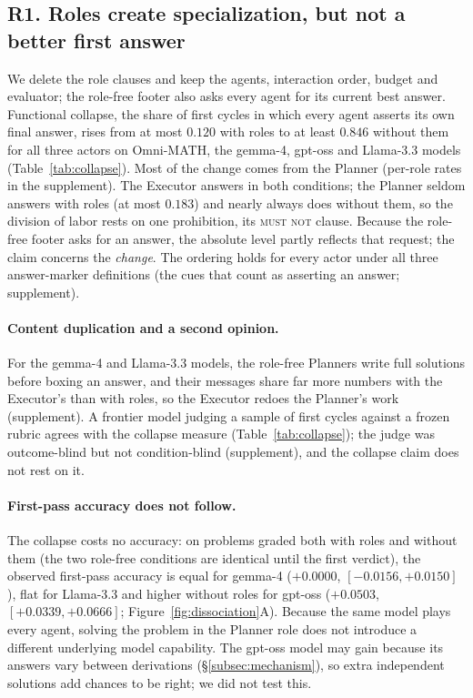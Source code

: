 \subsection{R1. Roles create specialization, but not a better first
answer}
\label{subsec:collapse}

We delete the role clauses and keep the agents, interaction order, budget
and evaluator; the role-free footer also asks every agent for its current
best answer. Functional collapse, the share of first cycles in which every
agent asserts its own final answer, rises from at most $0.120$ with roles to
at least $0.846$ without them for all three actors on Omni-MATH, the
gemma-4, gpt-oss and Llama-3.3 models (Table~\ref{tab:collapse}). Most of the change comes
from the Planner (per-role rates in the supplement). The Executor answers in
both conditions; the Planner seldom answers with roles (at most $0.183$) and nearly always does
without them, so the division of labor rests on one prohibition, its
\textsc{must not} clause. Because the role-free footer asks for an answer,
the absolute level partly reflects that request; the claim concerns the
\emph{change}. The ordering holds for every actor under all three
answer-marker definitions (the cues that count as asserting an answer;
supplement).



\paragraph{Content duplication and a second opinion.} For the gemma-4 and
Llama-3.3 models, the role-free Planners write full solutions before boxing
an answer, and their messages share far more numbers with the Executor's
than with roles, so the Executor redoes the Planner's work (supplement). A
frontier model judging a sample of first cycles against a frozen rubric
agrees with the collapse measure (Table~\ref{tab:collapse}); the judge was
outcome-blind but not condition-blind (supplement), and the collapse claim
does not rest on it.

\paragraph{First-pass accuracy does not follow.} The collapse costs no
accuracy: on problems graded both with roles and without them (the two
role-free conditions are identical until the first verdict), the observed first-pass accuracy is equal for gemma-4 ($+0.0000$,
$[-0.0156,+0.0150]$), flat for Llama-3.3 and higher without roles for
gpt-oss ($+0.0503$, $[+0.0339,+0.0666]$; Figure~\ref{fig:dissociation}A).
Because the same model plays every agent, solving the problem in the
Planner role does not introduce a different underlying model capability. The gpt-oss model may gain because its
answers vary between derivations (\S\ref{subsec:mechanism}), so extra
independent solutions add chances to be right; we did not test this.

